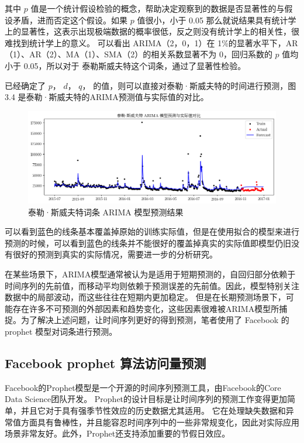 其中 $p$ 值是一个统计假设检验的概念，帮助决定观察到的数据是否显著性的与假设矛盾，进而否定这个假设。如果 $p$ 值很小，小于 0.05 那么就说结果具有统计学上的显著性，这表示出现极端数据的概率很低，反之则没有统计学上的相关性，很难找到统计学上的意义。
可以看出 ARIMA（2，0，1）在 1\%的显著水平下，AR（1）、AR（2）、MA（1）、SMA（2）的相关系数显著不为 0，回归系数的 $p$ 值均小于 0.05，所以对于 泰勒斯威夫特这个词条，通过了显著性检验。

已经确定了 $p$， $d$， $q$， 的值，则可以直接对泰勒·斯威夫特的时间进行预测，图3.4 是泰勒·斯威夫特的ARIMA预测值与实际值的对比。

\begin{figure}[htb]
  \centering
  \includegraphics[width=\textwidth]{figures/taylor_arima.png}
  \caption{泰勒·斯威夫特词条 ARIMA 模型预测结果}
\end{figure}

可以看到蓝色的线条基本覆盖掉原始的训练实际值，但是在使用拟合的模型来进行预测的时候，可以看到蓝色的线条并不能很好的覆盖掉真实的实际值即模型仍旧没有很好的预测到真实的实际情况，需要进一步的分析研究。

在某些场景下，ARIMA模型通常被认为是适用于短期预测的，自回归部分依赖于时间序列的先前值，而移动平均则依赖于预测误差的先前值。因此，模型特别关注数据中的局部波动，而这些往往在短期内更加稳定。
但是在长期预测场景下，可能存在许多不可预测的外部因素和趋势变化，这些因素很难被ARIMA模型所捕捉。为了解决上述问题，让时间序列更好的得到预测，笔者使用了 Facebook 的 prophet 模型对词条进行预测。

\subsection{Facebook prophet 算法访问量预测}

Facebook的Prophet模型是一个开源的时间序列预测工具，由Facebook的Core Data Science团队开发\cite{taylor2018forecasting}。
Prophet的设计目标是让时间序列的预测工作变得更加简单，并且它对于具有强季节性效应的历史数据尤其适用。
它在处理缺失数据和异常值方面具有鲁棒性，并且能容忍时间序列中的一些非常规变化，因此对实际应用场景非常友好。此外，Prophet还支持添加重要的节假日效应。

